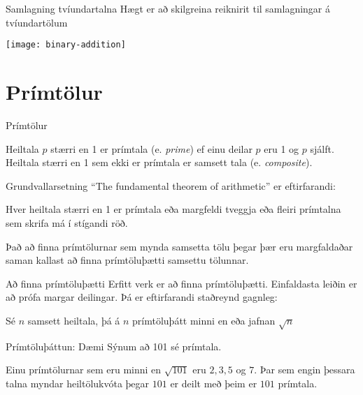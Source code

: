 \documentclass[handout]{beamer}
\begin{document}
\begin{frame}{Samlagning tvíundartalna}
Hægt er að skilgreina reiknirit til samlagningar á tvíundartölum
\begin{center}
\texttt{[image: binary-addition]}
\end{center}
\end{frame}

\section{Prímtölur}

\begin{frame}{Prímtölur}
\begin{tcolorbox}[title=Prímtölur]
Heiltala $p$ stærri en 1 er prímtala (e. \emph{prime}) ef einu deilar $p$ eru 1 og $p$ sjálft. Heiltala stærri en 1 sem ekki er prímtala er samsett tala (e. \emph{composite}).
\end{tcolorbox}
\end{frame}

\begin{frame}{Grundvallarsetning}
``The fundamental theorem of arithmetic'' er eftirfarandi:

\begin{tcolorbox}[title=Fundamental theorem of arithmetic]
Hver heiltala stærri en 1 er prímtala eða margfeldi tveggja eða fleiri prímtalna sem skrifa má í stígandi röð.
\end{tcolorbox}

Það að finna prímtölurnar sem mynda samsetta tölu þegar þær eru margfaldaðar saman kallast að finna prímtöluþætti samsettu tölunnar.
\end{frame}

\begin{frame}{Að finna prímtöluþætti}
Erfitt verk er að finna prímtöluþætti. Einfaldasta leiðin er að prófa margar deilingar. Þá er eftirfarandi staðreynd gagnleg:
\begin{tcolorbox}
Sé $n$ samsett heiltala, þá á $n$ prímtöluþátt minni en eða jafnan $\sqrt{n}$
\end{tcolorbox}
\end{frame}

\begin{frame}{Prímtöluþáttun: Dæmi}
Sýnum að 101 sé prímtala.

Einu prímtölurnar sem eru minni en $\sqrt{101}$ eru $2, 3, 5$ og $7$. Þar sem engin þessara talna myndar heiltölukvóta þegar $101$ er deilt með þeim er $101$ prímtala.
\end{frame}
\end{document}
